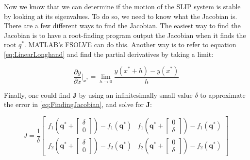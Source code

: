 
Now we know that we can determine if the motion of the SLIP system is stable by
looking at its eigenvalues. To do so, we need to know what the Jacobian is.
There are a few different ways to find the Jacobian.  The easiest way to
find the Jacobian is to have a root-finding program output the Jacobian when it finds the root $q^*$. MATLAB's FSOLVE can do this. Another way is to refer to
equation \ref{eq:LinearLonghand} and find the partial derivatives by taking a
limit:

\begin{equation}
\frac{\partial y}{\partial x}\bigg|_{x^{*}}
=\lim_{h \to 0} \frac{y(x^{*}+h)-y(x^{*})}{h}
\label{eq:FindingJacobian}
\end{equation}

Finally, one could find $\mathbf{J}$ by using an infinitesimally small value
$\delta$ to approximate the error in \ref{eq:FindingJacobian},
and solve for $\mathbf{J}$:


\begin{equation}
J= \frac{1}{\delta}
\begin{bmatrix}
    f_{1}\left(\mathbf{q}^{*}+\begin{bmatrix} \delta \\ 0 \end{bmatrix}\right)
        - f_{1}(\mathbf{q}^{*}) & f_{1}\left(\mathbf{q}^{*}+\begin{bmatrix} 0
            \\ \delta \end{bmatrix}\right) - f_{1}(\mathbf{q}^{*}) \\[3mm]

            f_{2}\left(\mathbf{q}^{*}+\begin{bmatrix} \delta \\ 0
            \end{bmatrix}\right) - f_{2}(\mathbf{q}^{*}) &
            f_{2}\left(\mathbf{q}^{*}+\begin{bmatrix} 0 \\ \delta
            \end{bmatrix}\right) - f_{2}(\mathbf{q}^{*})
\end{bmatrix}
\label{eq:FindingQStar}
\end{equation}

